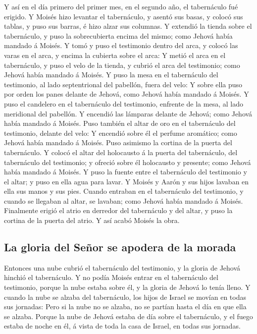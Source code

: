  Y así en el día primero del primer mes, en el segundo
año, el tabernáculo fué erigido.  Y Moisés hizo levantar
el tabernáculo, y asentó sus basas, y colocó sus tablas, y puso sus
barras, é hizo alzar sus columnas.  Y extendió la tienda
sobre el tabernáculo, y puso la sobrecubierta encima del mismo; como
Jehová había mandado á Moisés.  Y tomó y puso el
testimonio dentro del arca, y colocó las varas en el arca, y encima la
cubierta sobre el arca:  Y metió el arca en el
tabernáculo, y puso el velo de la tienda, y cubrió el arca del
testimonio; como Jehová había mandado á Moisés.  Y puso
la mesa en el tabernáculo del testimonio, al lado septentrional del
pabellón, fuera del velo:  Y sobre ella puso por orden
los panes delante de Jehová, como Jehová había mandado á Moisés.
 Y puso el candelero en el tabernáculo del testimonio,
enfrente de la mesa, al lado meridional del pabellón.  Y
encendió las lámparas delante de Jehová; como Jehová había mandado á
Moisés.  Puso también el altar de oro en el tabernáculo
del testimonio, delante del velo:  Y encendió sobre él el
perfume aromático; como Jehová había mandado á Moisés. 
Puso asimismo la cortina de la puerta del tabernáculo.  Y
colocó el altar del holocausto á la puerta del tabernáculo, del
tabernáculo del testimonio; y ofreció sobre él holocausto y presente;
como Jehová había mandado á Moisés.  Y puso la fuente
entre el tabernáculo del testimonio y el altar; y puso en ella agua para
lavar.  Y Moisés y Aarón y sus hijos lavaban en ella sus
manos y sus pies.  Cuando entraban en el tabernáculo del
testimonio, y cuando se llegaban al altar, se lavaban; como Jehová había
mandado á Moisés.  Finalmente erigió el atrio en derredor
del tabernáculo y del altar, y puso la cortina de la puerta del atrio. Y
así acabó Moisés la obra.

\hypertarget{la-gloria-del-seuxf1or-se-apodera-de-la-morada}{%
\subsection{La gloria del Señor se apodera de la
morada}\label{la-gloria-del-seuxf1or-se-apodera-de-la-morada}}

 Entonces una nube cubrió el tabernáculo del testimonio,
y la gloria de Jehová hinchió el tabernáculo.  Y no podía
Moisés entrar en el tabernáculo del testimonio, porque la nube estaba
sobre él, y la gloria de Jehová lo tenía lleno.  Y cuando
la nube se alzaba del tabernáculo, los hijos de Israel se movían en
todas sus jornadas:  Pero si la nube no se alzaba, no se
partían hasta el día en que ella se alzaba.  Porque la
nube de Jehová estaba de día sobre el tabernáculo, y el fuego estaba de
noche en él, á vista de toda la casa de Israel, en todas sus jornadas.
